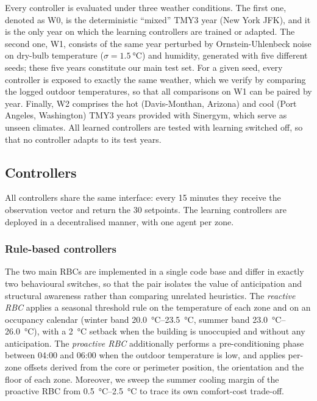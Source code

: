 \documentclass[conference]{IEEEtran}
\begin{document}
Every controller is evaluated under three weather conditions. The first one,
denoted as W0, is the deterministic ``mixed'' TMY3 year (New York JFK), and it
is the only year on which the learning controllers are trained or adapted. The
second one, W1, consists of the same year perturbed by Ornstein-Uhlenbeck noise
on dry-bulb temperature ($\sigma = \SI{1.5}{\celsius}$) and humidity, generated
with five different seeds; these five years constitute our main test set. For
a given seed, every controller is exposed to exactly the same weather, which we
verify by comparing the logged outdoor temperatures, so that all comparisons on
W1 can be paired by year. Finally, W2 comprises the hot (Davis-Monthan, Arizona) and cool (Port
Angeles, Washington) TMY3 years provided with Sinergym, which serve as
unseen climates.
All learned controllers are tested with learning switched off, so that no
controller adapts to its test years.

\subsection{Controllers}

All controllers share the same interface: every 15 minutes they receive the
observation vector and return the 30 setpoints. The learning controllers are
deployed in a decentralised manner, with one agent per zone.

\subsubsection{Rule-based controllers}
The two main RBCs are implemented in a single code base and differ in exactly
two behavioural switches, so that the pair isolates the value of anticipation
and structural awareness rather than comparing unrelated heuristics. The
\emph{reactive RBC} applies a seasonal threshold rule on the temperature of
each zone and on an occupancy calendar (winter band
\SIrange{20.0}{23.5}{\celsius}, summer band \SIrange{23.0}{26.0}{\celsius}),
with a \SI{2}{\celsius} setback when the building is unoccupied and without any
anticipation. The \emph{proactive RBC} additionally performs a pre-conditioning
phase between 04:00 and 06:00 when the outdoor temperature is low, and applies
per-zone offsets derived from the core or perimeter position, the orientation
and the floor of each zone. Moreover, we sweep the summer cooling margin of the
proactive RBC from \SIrange{0.5}{2.5}{\celsius} to trace its own
comfort-cost trade-off.
\end{document}
